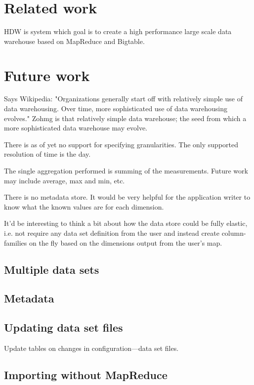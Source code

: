 \documentclass[a4paper,10pt]{book}
\begin{document}
\section{Related work}

HDW is system which goal is to create a high performance large scale data
warehouse based on MapReduce and Bigtable. \cite{hdw}



\section{Future work}

Says Wikipedia: "Organizations generally start off with relatively simple use
of data warehousing. Over time, more sophisticated use of data warehousing
evolves." Zohmg is that relatively simple data warehouse; the seed from which
a more sophisticated data warehouse may evolve.

There is as of yet no support for specifying granularities. The only supported
resolution of time is the day.

The single aggregation performed is summing of the measurements. Future work
may include average, max and min, etc.

There is no metadata store. It would be very helpful for the application
writer to know what the known values are for each dimension.

It'd be interesting to think a bit about how the data store could be fully
elastic, i.e. not require any data set definition from the user and instead
create column-families on the fly based on the dimensions output from the
user's map.
\subsection{Multiple data sets}

\subsection{Metadata}

\subsection{Updating data set files}

Update tables on changes in configuration---data set files.

\subsection{Importing without MapReduce}
\end{document}
